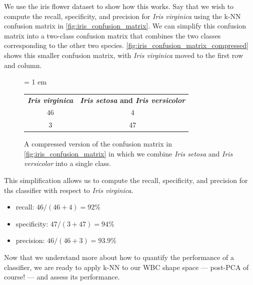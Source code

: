 We use the iris flower dataset to show how this works. Say that we wish to compute the recall, specificity, and precision for \textit{Iris virginica} using the k-NN confusion matrix in \autoref{fig:iris_confusion_matrix}. We can simplify this confusion matrix into a two-class confusion matrix that combines the two classes corresponding to the other two species. \autoref{fig:iris_confusion_matrix_compressed}
 shows this smaller confusion matrix, with \textit{Iris virginica} moved to the first row and column.\\

 \begin{figure}[h]
\centering
\tabcolsep = 1 em
\mySfFamily
\begin{tabular}{c c}
\rowcolor{gray!50}
\textbf{\textit{Iris virginica}} & \textbf{\textit{Iris setosa} and \textit{Iris versicolor}} \\
46 & 4 \\
3 & 47 \\
\end{tabular}
\caption{A compressed version of the confusion matrix in \autoref{fig:iris_confusion_matrix} in which we combine \textit{Iris setosa} and \textit{Iris versicolor} into a single class.}
\label{fig:iris_confusion_matrix_compressed}
\end{figure}

This simplification allows us to compute the recall, specificity, and precision for ths classifier with respect to \textit{Iris virginica}.

\begin{itemize}
\item recall: $46/(46+4) = 92\%$
\item specificity: $47/(3+47) = 94\%$
\item precision: $46/(46+3) = 93.9\%$
\end{itemize}

\fudgespace

\begin{qbox}\end{qbox}

Now that we understand more about how to quantify the performance of a classifier, we are ready to apply k-NN to our WBC shape space --- post-PCA of course! --- and assess its performance.

